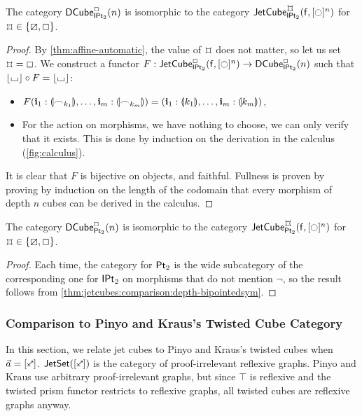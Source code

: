 \documentclass[a4paper]{memoir}
\begin{document}
\begin{proposition} \label{thm:jetcubes:comparison:depth-bipointedsym}
	The category ${\mathsf{DCube}}^{\Box}_{{\mathsf{IPt}_2}}\mathopen{}\left( n \right)\mathclose{}$ is isomorphic to the category $\jetcubefwd \mycubex \bipointedsym {[\npolar]^n}$ for $\mycubex \in \accol{\cartes, \affine}$.
\end{proposition}
\begin{proof}
	By \cref{thm:affine-automatic}, the value of $\mycubex$ does not matter, so let us set $\mycubex = \affine$.
	We construct a functor $F : \jetcubefwd \affine \bipointedsym {[\npolar]^n} \to \dcubeopt \affine \bipointedsym n$ such that $\mathopen{}\left\lfloor {\llcorner\hspace{-.4ex}\lrcorner} \right\rfloor\mathclose{} \circ F = \mathopen{}\left\lfloor {\llcorner\hspace{-.4ex}\lrcorner} \right\rfloor\mathclose{}$:
	\begin{itemize}
		\item $F(\mathbf{i}_1 : {\llparenthesis \frown_{k_1} \rrparenthesis}, \ldots, \mathbf{i}_m : {\llparenthesis \frown_{k_m} \rrparenthesis}) = (\mathbf{i}_1 : {\llparenthesis k_1 \rrparenthesis}, \ldots, \mathbf{i}_m : {\llparenthesis k_m \rrparenthesis})$,
		\item For the action on morphisms, we have nothing to choose, we can only verify that it exists. This is done by induction on the derivation in the calculus (\cref{fig:calculus}).
	\end{itemize}
	
	It is clear that $F$ is bijective on objects, and faithful.
	Fullness is proven by proving by induction on the length of the codomain that every morphism of depth $n$ cubes can be derived in the calculus.
\end{proof}

\begin{proposition} \label{thm:jetcubes:comparison:depth-bipointed}
	The category ${\mathsf{DCube}}^{\Box}_{{\mathsf{Pt}_2}}\mathopen{}\left( n \right)\mathclose{}$ is isomorphic to the category $\jetcubefwd \mycubex \bipointed {[\npolar]^n}$ for $\mycubex \in \accol{\cartes, \affine}$.
\end{proposition}
\begin{proof}
	Each time, the category for ${\mathsf{Pt}_2}$ is the wide subcategory of the corresponding one for ${\mathsf{IPt}_2}$ on morphisms that do not mention $\lnot$, so the result follows from \cref{thm:jetcubes:comparison:depth-bipointedsym}.
\end{proof}

\subsubsection{Comparison to Pinyo and Kraus's Twisted Cube Category}
In this section, we relate jet cubes to Pinyo and Kraus's twisted cubes \cite{pinyo-twisted} when $\vec a = [\ypolar]$.
$\jetset{[\ypolar]}$ is the category of proof-irrelevant reflexive graphs.
Pinyo and Kraus use arbitrary proof-irrelevant graphs, but since $\top$ is reflexive and the twisted prism functor \cite[def.\ 4]{pinyo-twisted} restricts to reflexive graphs, all twisted cubes are reflexive graphs anyway.
\end{document}
